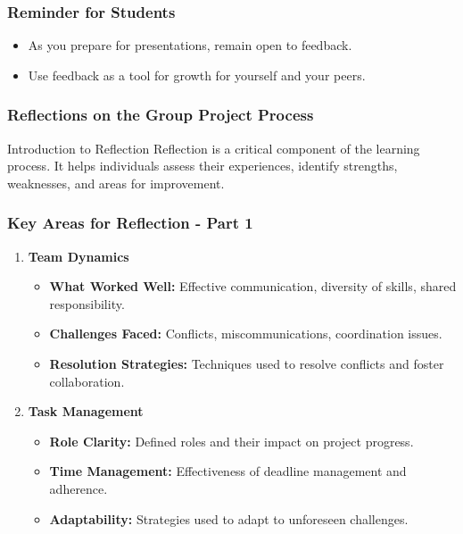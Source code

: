 \documentclass{beamer}
\begin{document}
\begin{frame}[fragile]
    \frametitle{Reminder for Students}
    \begin{itemize}
        \item As you prepare for presentations, remain open to feedback.
        \item Use feedback as a tool for growth for yourself and your peers.
    \end{itemize}
\end{frame}

\begin{frame}[fragile]
    \frametitle{Reflections on the Group Project Process}
    \begin{block}{Introduction to Reflection}
        Reflection is a critical component of the learning process. It helps individuals assess their experiences, identify strengths, weaknesses, and areas for improvement.
    \end{block}
\end{frame}

\begin{frame}[fragile]
    \frametitle{Key Areas for Reflection - Part 1}
    \begin{enumerate}
        \item \textbf{Team Dynamics}
        \begin{itemize}
            \item \textbf{What Worked Well:} Effective communication, diversity of skills, shared responsibility.
            \item \textbf{Challenges Faced:} Conflicts, miscommunications, coordination issues.
            \item \textbf{Resolution Strategies:} Techniques used to resolve conflicts and foster collaboration.
        \end{itemize}

        \item \textbf{Task Management}
        \begin{itemize}
            \item \textbf{Role Clarity:} Defined roles and their impact on project progress.
            \item \textbf{Time Management:} Effectiveness of deadline management and adherence.
            \item \textbf{Adaptability:} Strategies used to adapt to unforeseen challenges.
        \end{itemize}
    \end{enumerate}
\end{frame}
\end{document}
